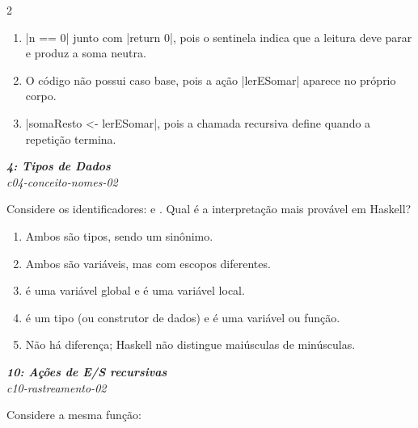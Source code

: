 \documentclass[a4paper,10pt,brazil]{article}
\begin{document}
\begin{multicols}{2}
\begin{enumerate}
  \item \haskellinline|n == 0| junto com \haskellinline|return 0|, pois o sentinela indica que a leitura deve parar e produz a soma neutra.

  \item O código não possui caso base, pois a ação \haskellinline|lerESomar| aparece no próprio corpo.

  \item \haskellinline|somaResto <- lerESomar|, pois a chamada recursiva define quando a repetição termina.


\end{enumerate}

\begin{flushright}
  \footnotesize
  \textit{\textbf{4: Tipos de Dados}}\\
  \textit{c04-conceito-nomes-02}\\

\end{flushright}
Considere os identificadores:  e . Qual é a interpretação mais provável em Haskell?

\begin{enumerate}
  \item Ambos são tipos, sendo  um sinônimo.

  \item Ambos são variáveis, mas com escopos diferentes.

  \item {} é uma variável global e  é uma variável local.

  \item {} é um tipo (ou construtor de dados) e  é uma variável ou função.

  \item Não há diferença; Haskell não distingue maiúsculas de minúsculas.


\end{enumerate}

\begin{flushright}
  \footnotesize
  \textit{\textbf{10: Ações de E/S recursivas}}\\
  \textit{c10-rastreamento-02}\\

\end{flushright}
Considere a mesma função:


\end{multicols}
\end{document}
